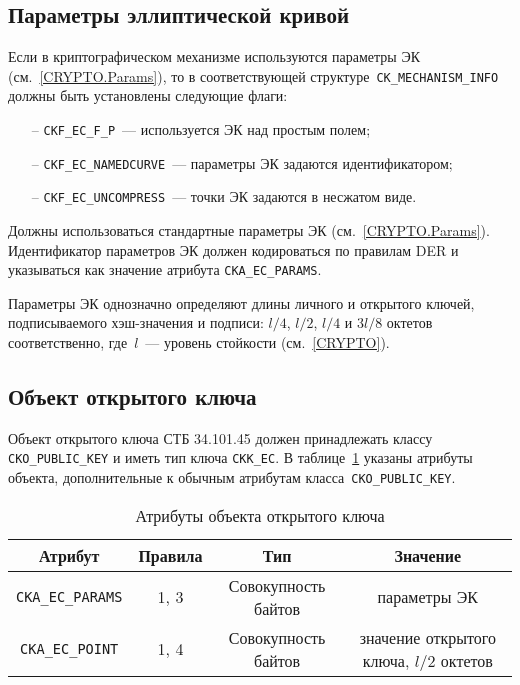 \subsection{Параметры эллиптической кривой}

Если в криптографическом механизме используются параметры ЭК
(см.~\ref{CRYPTO.Params}), то в соответствующей
структуре~\verb|CK_MECHANISM_INFO| должны быть установлены 
следующие флаги: 
\begin{itemize}
\item[--]
\verb|CKF_EC_F_P|~--- используется ЭК над простым полем;
\item[--]
\verb|CKF_EC_NAMEDCURVE|~--- параметры ЭК задаются идентификатором;
\item[--]
\verb|CKF_EC_UNCOMPRESS|~--- точки ЭК задаются в несжатом виде.
\end{itemize}

Должны использоваться стандартные параметры ЭК
(см.~\ref{CRYPTO.Params}).
Идентификатор параметров ЭК должен кодироваться по правилам
DER и указываться как значение атрибута \verb|CKA_EC_PARAMS|.

Параметры ЭК однозначно определяют длины личного и открытого ключей, 
подписываемого хэш-значения и подписи: $l/4$, $l/2$, $l/4$ и $3l/8$ 
октетов соответственно, где~$l$~--- уровень стойкости (см.~\ref{CRYPTO}). 

\subsection{Объект открытого ключа}


Объект открытого ключа СТБ 34.101.45 должен принадлежать
классу \verb|CKO_PUBLIC_KEY| и иметь тип ключа \verb|CKK_EC|.
%
В таблице~\ref{Table.CRYPTOKI.EcPubkeyAttrs} указаны
атрибуты объекта, дополнительные к обычным атрибутам 
класса~\verb|CKO_PUBLIC_KEY|.

\begin{table}[H]
\caption{Атрибуты объекта открытого ключа}\label{Table.CRYPTOKI.EcPubkeyAttrs}
\begin{tabular}{|c|c|c|c|}
\hline
Атрибут & Правила & Тип & Значение\\
\hline
\hline
\verb|CKA_EC_PARAMS| & 1, 3 & Совокупность байтов &
параметры ЭК\\
\hline
\verb|CKA_EC_POINT| & 1, 4 & Совокупность байтов &
значение открытого ключа, $l/2$ октетов\\
\hline
\end{tabular}
\end{table}

